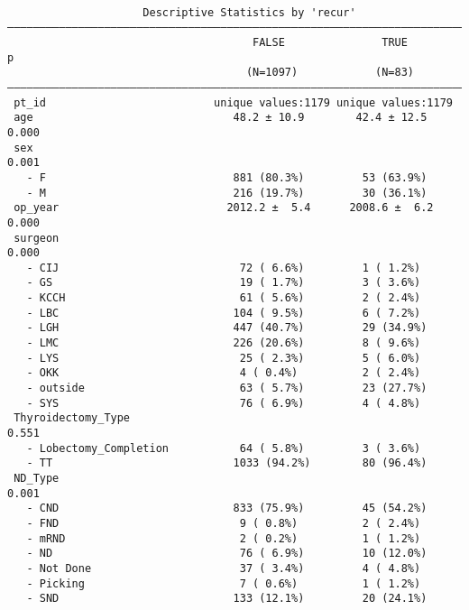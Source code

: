 \documentclass[
  letterpaper,
  DIV=11,
  numbers=noendperiod]{scrartcl}
\begin{document}
\begin{verbatim}

                     Descriptive Statistics by 'recur'                    
——————————————————————————————————————————————————————————————————————————— 
                                      FALSE               TRUE          p  
                                     (N=1097)            (N=83)      
——————————————————————————————————————————————————————————————————————————— 
 pt_id                          unique values:1179 unique values:1179      
 age                               48.2 ± 10.9        42.4 ± 12.5     0.000
 sex                                                                  0.001
   - F                             881 (80.3%)         53 (63.9%)          
   - M                             216 (19.7%)         30 (36.1%)          
 op_year                          2012.2 ±  5.4      2008.6 ±  6.2    0.000
 surgeon                                                              0.000
   - CIJ                            72 ( 6.6%)         1 ( 1.2%)           
   - GS                             19 ( 1.7%)         3 ( 3.6%)           
   - KCCH                           61 ( 5.6%)         2 ( 2.4%)           
   - LBC                           104 ( 9.5%)         6 ( 7.2%)           
   - LGH                           447 (40.7%)         29 (34.9%)          
   - LMC                           226 (20.6%)         8 ( 9.6%)           
   - LYS                            25 ( 2.3%)         5 ( 6.0%)           
   - OKK                            4 ( 0.4%)          2 ( 2.4%)           
   - outside                        63 ( 5.7%)         23 (27.7%)          
   - SYS                            76 ( 6.9%)         4 ( 4.8%)           
 Thyroidectomy_Type                                                   0.551
   - Lobectomy_Completion           64 ( 5.8%)         3 ( 3.6%)           
   - TT                            1033 (94.2%)        80 (96.4%)          
 ND_Type                                                              0.001
   - CND                           833 (75.9%)         45 (54.2%)          
   - FND                            9 ( 0.8%)          2 ( 2.4%)           
   - mRND                           2 ( 0.2%)          1 ( 1.2%)           
   - ND                             76 ( 6.9%)         10 (12.0%)          
   - Not Done                       37 ( 3.4%)         4 ( 4.8%)           
   - Picking                        7 ( 0.6%)          1 ( 1.2%)           
   - SND                           133 (12.1%)         20 (24.1%)          

\end{verbatim}
\end{document}
